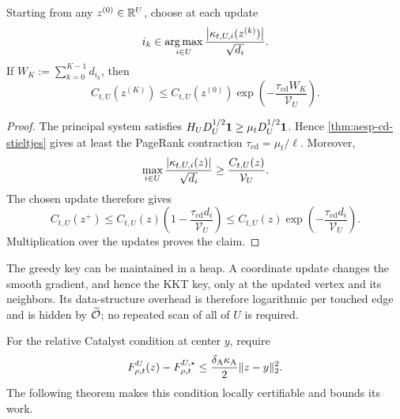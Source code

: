 \begin{lemma}
\label{lem:aesp-cd-greedy-linear}
Starting from any $z^{(0)}\in\mathbb{R}^U$, choose at each update
\begin{equation*}
 i_k\in\operatorname*{arg\,max}_{i\in U}
       \frac{\left\lvert \kappa_{t,U,i}(z^{(k)}) \right\rvert}{\sqrt{d_i}}.
\end{equation*}
If $W_K:=\sum_{k=0}^{K-1}d_{i_k}$, then
\begin{equation}
 C_{t,U}(z^{(K)})
 \leq C_{t,U}(z^{(0)})
       \exp\left(-\frac{\tau_{\mathrm{cd}}W_K}{\mathcal V_U}\right).
 \label{eq:aesp-cd-greedy-linear}
\end{equation}
\end{lemma}

\begin{proof}
The principal system satisfies
$H_UD_U^{1/2}\mathbf{1}\geq\mu_tD_U^{1/2}\mathbf{1}$.  Hence
\cref{thm:aesp-cd-stieltjes} gives at least the PageRank contraction
$\tau_{\mathrm{cd}}=\mu_t/\ell$.  Moreover,
\begin{equation*}
 \max_{i\in U}
 \frac{\left\lvert \kappa_{t,U,i}(z) \right\rvert}{\sqrt{d_i}}
 \geq\frac{C_{t,U}(z)}{\mathcal V_U}.
\end{equation*}
The chosen update therefore gives
\begin{equation*}
 C_{t,U}(z^+)
 \leq C_{t,U}(z)
       \left(1-\frac{\tau_{\mathrm{cd}}d_i}{\mathcal V_U}\right)
 \leq C_{t,U}(z)
       \exp\left(-\frac{\tau_{\mathrm{cd}}d_i}{\mathcal V_U}\right).
\end{equation*}
Multiplication over the updates proves the claim.
\end{proof}

The greedy key can be maintained in a heap.  A coordinate update changes the
smooth gradient, and hence the KKT key, only at the updated vertex and its
neighbors.  Its data-structure overhead is therefore logarithmic per touched
edge and is hidden by $\widetilde{\mathcal{O}}$; no repeated scan of all of $U$ is required.

For the relative Catalyst condition at center $y$, require
\begin{equation}
 F_{\rho,t}^U(z)-F_{\rho,t}^{U,\star}
 \leq\frac{\delta_{\mathrm A}\kappa_{\mathrm A}}2
             \lVert z-y\rVert_2^2.
 \label{eq:aesp-cd-c2}
\end{equation}
The following theorem makes this condition locally certifiable and bounds
its work.

